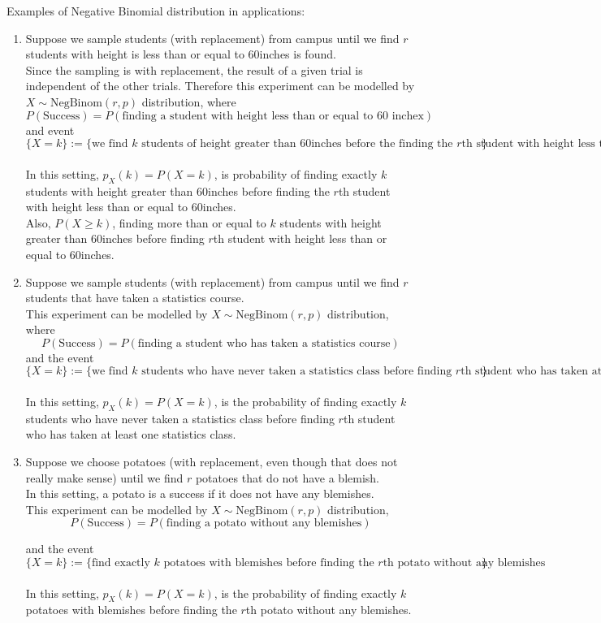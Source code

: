 Examples of Negative Binomial distribution in applications:
\begin{enumerate}
    \item Suppose we sample students (with replacement) from campus until we find $r$ students with height is less than or equal to 60inches is found. 
    \\
    Since the sampling is with replacement, the result of a given trial is independent of the other trials. Therefore this experiment can be modelled by $X\sim \text{NegBinom}(r, p)$ distribution, where $$P(\text{Success}) = P(\text{finding a student with height less than or equal to 60 inchex})$$ 
    and  event
    $$\{X= k \} := \{\text{we find $k$ students of height greater than 60inches before the finding the $r$th student with height less than or equal to 60 inches}\}$$
    \\
    In this setting, $p_X(k) = P(X=k)$, is probability of finding exactly $k$ students with height greater than 60inches before finding the $r$th student with height less than or equal to 60inches.  
    \\
    Also, $P(X \ge k)$, finding more than or equal to $k$ students with height greater than 60inches before finding $r$th student with height less than or equal to 60inches.
    \item  Suppose we sample students (with replacement) from campus until we find $r$ students that have taken a statistics course. 
    \\
    This experiment can be modelled by $X\sim \text{NegBinom}(r, p)$ distribution, 
    where
    $$P(\text{Success}) = P(\text{finding a student who has taken a statistics course})$$
    and the event 
    $$\{X= k \} := \{\text{we find $k$ students who have never taken a statistics class before finding $r$th student who has taken at least one statistics class}\}$$
    \\
    In this setting, $p_X(k) = P(X=k)$,  is the probability of finding exactly $k$ students who have never taken a statistics class before finding $r$th student who has taken at least one statistics class. 
    
    \item  Suppose we choose potatoes (with replacement, even though that does not really make sense) until we find $r$ potatoes that do not have a blemish. 
    \\
    
    In this setting, a potato is a success if it does not have any blemishes. 
    \\
    This experiment can be modelled by $X\sim \text{NegBinom}(r, p)$ distribution, 
    $$P(\text{Success}) = P(\text{finding a potato without any blemishes})$$
    
    and the event 
    $$\{X=k\} := \{\text{find exactly $k$ potatoes with blemishes before finding the $r$th potato without any blemishes}\}$$
    \\
    In this setting, $p_X(k) = P(X=k)$, is the probability of finding exactly $k$ potatoes with blemishes before finding the $r$th potato without any blemishes. 
\end{enumerate}


